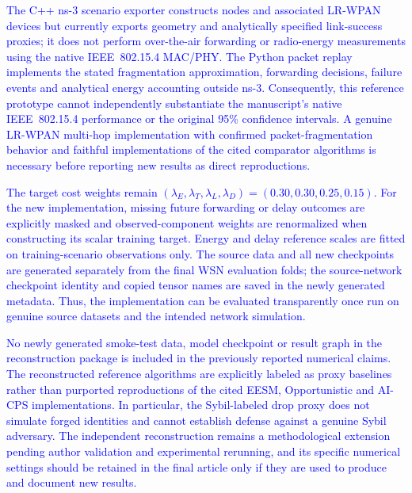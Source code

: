 \documentclass[pdflatex,sn-mathphys-num]{sn-jnl}
\newcommand{\Revised}[1]{\textcolor{blue}{#1}}
\begin{document}
\Revised{The C++ ns-3 scenario exporter constructs nodes and associated LR-WPAN devices but currently exports geometry and analytically specified link-success proxies; it does not perform over-the-air forwarding or radio-energy measurements using the native IEEE~802.15.4 MAC/PHY. The Python packet replay implements the stated fragmentation approximation, forwarding decisions, failure events and analytical energy accounting outside ns-3. Consequently, this reference prototype cannot independently substantiate the manuscript's native IEEE~802.15.4 performance or the original 95\% confidence intervals. A genuine LR-WPAN multi-hop implementation with confirmed packet-fragmentation behavior and faithful implementations of the cited comparator algorithms is necessary before reporting new results as direct reproductions.}

\Revised{The target cost weights remain $(\lambda_E,\lambda_T,\lambda_L,\lambda_D)=(0.30,0.30,0.25,0.15)$. For the new implementation, missing future forwarding or delay outcomes are explicitly masked and observed-component weights are renormalized when constructing its scalar training target. Energy and delay reference scales are fitted on training-scenario observations only. The source data and all new checkpoints are generated separately from the final WSN evaluation folds; the source-network checkpoint identity and copied tensor names are saved in the newly generated metadata. Thus, the implementation can be evaluated transparently once run on genuine source datasets and the intended network simulation.}

\Revised{No newly generated smoke-test data, model checkpoint or result graph in the reconstruction package is included in the previously reported numerical claims. The reconstructed reference algorithms are explicitly labeled as proxy baselines rather than purported reproductions of the cited EESM, Opportunistic and AI-CPS implementations. In particular, the Sybil-labeled drop proxy does not simulate forged identities and cannot establish defense against a genuine Sybil adversary. The independent reconstruction remains a methodological extension pending author validation and experimental rerunning, and its specific numerical settings should be retained in the final article only if they are used to produce and document new results.}
\end{document}
